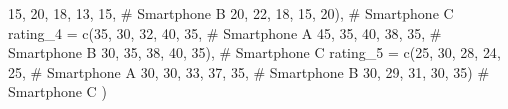 \documentclass[
  letterpaper,
  DIV=11,
  numbers=noendperiod]{scrartcl}
\newenvironment{Shaded}{\begin{snugshade}}{\end{snugshade}}
\newcommand{\AttributeTok}[1]{\textcolor[rgb]{0.40,0.45,0.13}{#1}}
\newcommand{\CommentTok}[1]{\textcolor[rgb]{0.37,0.37,0.37}{#1}}
\newcommand{\DecValTok}[1]{\textcolor[rgb]{0.68,0.00,0.00}{#1}}
\newcommand{\FunctionTok}[1]{\textcolor[rgb]{0.28,0.35,0.67}{#1}}
\newcommand{\NormalTok}[1]{\textcolor[rgb]{0.00,0.23,0.31}{#1}}
\begin{document}
\begin{Shaded}
\begin{Highlighting}[]
               \DecValTok{15}\NormalTok{, }\DecValTok{20}\NormalTok{, }\DecValTok{18}\NormalTok{, }\DecValTok{13}\NormalTok{, }\DecValTok{15}\NormalTok{,   }\CommentTok{\# Smartphone B}
               \DecValTok{20}\NormalTok{, }\DecValTok{22}\NormalTok{, }\DecValTok{18}\NormalTok{, }\DecValTok{15}\NormalTok{, }\DecValTok{20}\NormalTok{),  }\CommentTok{\# Smartphone C}
  \AttributeTok{rating\_4 =} \FunctionTok{c}\NormalTok{(}\DecValTok{35}\NormalTok{, }\DecValTok{30}\NormalTok{, }\DecValTok{32}\NormalTok{, }\DecValTok{40}\NormalTok{, }\DecValTok{35}\NormalTok{,   }\CommentTok{\# Smartphone A}
               \DecValTok{45}\NormalTok{, }\DecValTok{35}\NormalTok{, }\DecValTok{40}\NormalTok{, }\DecValTok{38}\NormalTok{, }\DecValTok{35}\NormalTok{,   }\CommentTok{\# Smartphone B}
               \DecValTok{30}\NormalTok{, }\DecValTok{35}\NormalTok{, }\DecValTok{38}\NormalTok{, }\DecValTok{40}\NormalTok{, }\DecValTok{35}\NormalTok{),  }\CommentTok{\# Smartphone C}
  \AttributeTok{rating\_5 =} \FunctionTok{c}\NormalTok{(}\DecValTok{25}\NormalTok{, }\DecValTok{30}\NormalTok{, }\DecValTok{28}\NormalTok{, }\DecValTok{24}\NormalTok{, }\DecValTok{25}\NormalTok{,   }\CommentTok{\# Smartphone A}
               \DecValTok{30}\NormalTok{, }\DecValTok{30}\NormalTok{, }\DecValTok{33}\NormalTok{, }\DecValTok{37}\NormalTok{, }\DecValTok{35}\NormalTok{,   }\CommentTok{\# Smartphone B}
               \DecValTok{30}\NormalTok{, }\DecValTok{29}\NormalTok{, }\DecValTok{31}\NormalTok{, }\DecValTok{30}\NormalTok{, }\DecValTok{35}\NormalTok{)   }\CommentTok{\# Smartphone C}
\NormalTok{)}


\end{Highlighting}
\end{Shaded}
\end{document}
